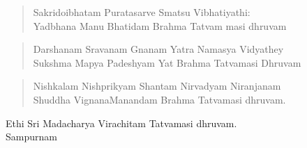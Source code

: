 \begin{verse}
 Sakridoibhatam Puratasarve Smatsu Vibhatiyathi:\\
 Yadbhana Manu Bhatidam Brahma Tatvam masi dhruvam
\end{verse}

\begin{verse}
 Darshanam Sravanam Gnanam Yatra Namasya Vidyathey\\
 Sukshma Mapya Padeshyam Yat Brahma Tatvamasi Dhruvam
\end{verse}

\begin{verse}
 Nishkalam Nishprikyam Shantam Nirvadyam Niranjanam\\
 Shuddha VignanaManandam Brahma Tatvamasi dhruvam.
\end{verse}

\begin{center}
Ethi Sri Madacharya Virachitam Tatvamasi dhruvam. \\ Sampurnam
\end{center}

\delimiter

